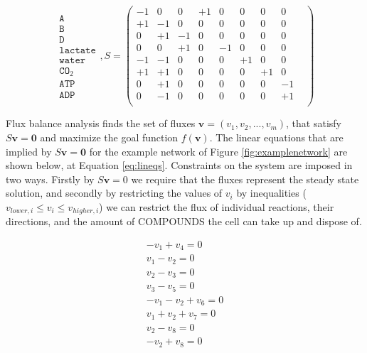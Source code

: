 \documentclass[10pt,a4paper]{article}
\begin{document}
	\begin{equation}
	\begin{matrix}
		\texttt{A}   \\
		\texttt{B}\\
		\texttt{D}\\
		\texttt{lactate}\\
		\texttt{water}\\
		\texttt{CO}_2\\
		\texttt{ATP}\\
		\texttt{ADP}
	\end{matrix}
	,S=
	\begin{pmatrix}
			  -1 &  0 &  0 & +1 &  0 &  0 & 0 & 0 & \\ 
			  +1 & -1 &  0 &  0 &  0 &  0 & 0 &0 &  \\ 
			  0 & +1 & -1 &  0 &  0 &  0 & 0 & 0 & \\ 
			  0  &  0 & +1 &  0 & -1 &  0 & 0 & 0 & \\ 
			  -1 & -1 &  0 &  0 &  0 &+1  & 0 & 0 & \\ 
			  +1 & +1 &  0 &  0 &  0 &  0 & +1&0 &  \\ 
			  0 & +1 &  0 &  0 &  0 & 0 &0 & -1 &\\ 
			  0 & -1 &  0 &  0 &  0 & 0 &0 & +1 & \\ 
			  
		\end{pmatrix} 
		\label{eq:examplematrix}
	\end{equation}


	Flux balance analysis finds the set of fluxes $\mathbf{v}=\left( v_1,v_2,...,v_m \right)$, that satisfy $S\mathbf{v}=\mathbf{0}$ and maximize the goal function $f \left( \mathbf{v} \right)$. The linear equations that are implied by $S\mathbf{v}=\mathbf{0}$ for the example network of Figure \ref{fig:examplenetwork} are shown below, at Equation \ref{eq:lineqs}. Constraints on the system are imposed in two ways. Firstly by $S\mathbf{v}=0$ we require that the fluxes represent the steady state solution, and secondly by restricting the values of $v_i$ by inequalities ($v_{lower,i}\leq v_i \leq v_{higher,i}$) we can restrict the flux of individual reactions, their directions, and the amount of COMPOUNDS the cell can take up and dispose of. 
	

	\begin{equation}\label{eq:lineqs}
		\begin{matrix}
			- v_1+v_4=0 \\
			v_1-v_2=0 \\
			v_2-v_3=0 \\
			v_3-v_5=0 \\
			-v_1-v_2+v_6=0 \\
			v_1+v_2+v_7=0 \\
			v_2-v_8=0 \\
			-v_2+v_8=0
		\end{matrix}
	\end{equation}
\end{document}
